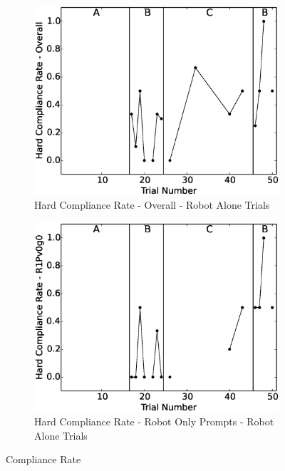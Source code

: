 \begin{figure}[h]
	
	\begin{subfigure}[b]{0.49\textwidth}
		\includegraphics[width=1.1\linewidth]{./img/data_analysis/103HardComplianceRate-Overall_robotAloneOnly.eps}
		\caption{Hard Compliance Rate - Overall - Robot Alone Trials}
		\label{fig:103HardComplianceRate-Overall_robotAloneOnly}
	\end{subfigure}
	\hfill
	\begin{subfigure}[b]{0.49\textwidth}
		\includegraphics[width=1.1\linewidth]{./img/data_analysis/92HardComplianceRate-R1Pv0g0_robotAloneOnly.eps}
		\caption{Hard Compliance Rate - Robot Only Prompts - Robot Alone Trials}
		\label{fig:92HardComplianceRate-R1Pv0g0_robotAloneOnly}
	\end{subfigure}%
	\caption{Compliance Rate}
	\label{fig:ComplianceRate_robotAloneOnly}
\end{figure}
